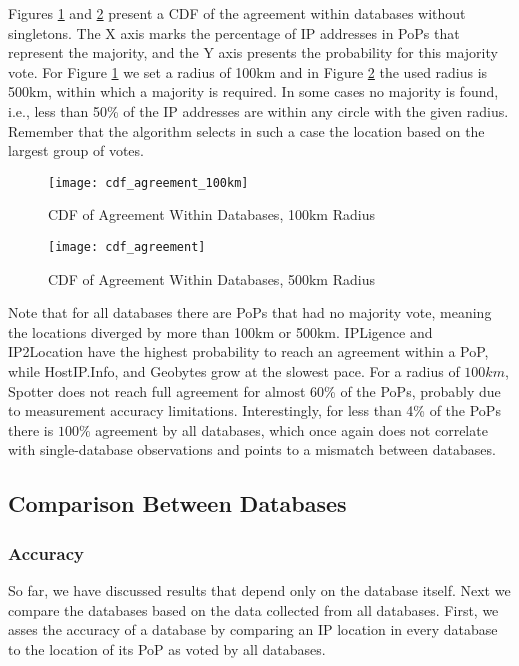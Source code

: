 Figures \ref{fig:cdf_agreement_100k} and \ref{fig:cdf_agreement}
present a CDF of the agreement within databases without singletons.
The X axis marks the percentage of IP addresses in PoPs that
represent the majority, and the Y axis presents the probability for
this majority vote. For Figure \ref{fig:cdf_agreement_100k} we set a
radius of 100km and in Figure \ref{fig:cdf_agreement} the used
radius is 500km, within which a majority is required. In some cases
no majority is found, i.e., less than 50\% of the IP addresses are
within any circle with the given radius. Remember that the algorithm
selects in such a case the location based on the largest group of
votes.

\begin{figure}
\begin{minipage}[b]{\linewidth}
\centering
\texttt{[image: cdf\_agreement\_100km]}
\caption{CDF of Agreement Within Databases, 100km Radius}
\label{fig:cdf_agreement_100k}
\end{minipage}
\end{figure}

\begin{figure}
\begin{minipage}[b]{\linewidth}
\centering
\texttt{[image: cdf\_agreement]}
\caption{CDF of Agreement Within Databases, 500km Radius}
\label{fig:cdf_agreement}
\end{minipage}
\end{figure}



Note that for all databases there are PoPs that had no majority
vote, meaning the locations diverged by more than 100km or 500km.
IPLigence and IP2Location have the highest probability to reach an
agreement within a PoP, while HostIP.Info, and Geobytes grow at the
slowest pace. For a radius of $100km$, Spotter does not reach full
agreement for almost 60\% of the PoPs, probably due to measurement
accuracy limitations. Interestingly, for less than 4\% of the PoPs
there is $100\%$ agreement by all databases, which once again does
not correlate with single-database observations and points to a
mismatch between databases.



\subsection{Comparison Between Databases} \label{subsec:compare}
\subsubsection{Accuracy}
So far, we have discussed results that depend only on the database
itself. Next we compare the databases based on the data collected
from all databases. First, we asses the accuracy of a database by
comparing an IP location in every database to the location of its
PoP as voted by all databases.


